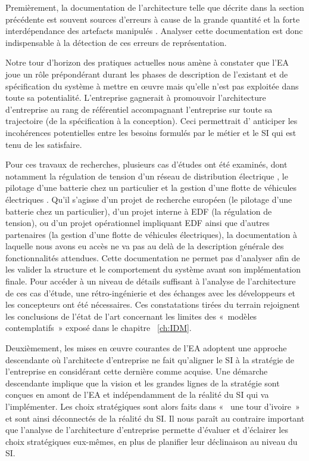 Premièrement, la documentation de l'architecture telle que décrite dans la
section précédente est souvent sources d'erreurs à cause de la grande quantité
et la forte interdépendance des artefacts manipulés
\cite{kaisler_enterprise_2005}. Analyser cette documentation est donc
indispensable à la détection de ces erreurs de représentation.

Notre tour d'horizon des pratiques actuelles nous amène à constater que l'EA
joue un rôle prépondérant durant les phases de description de l'existant et de
spécification du système à mettre en œuvre mais qu'elle n'est pas exploitée dans
toute sa potentialité. L'entreprise gagnerait à promouvoir l'architecture
d'entreprise au rang de référentiel accompagnant l'entreprise sur toute sa
trajectoire (de la spécification à la conception). Ceci permettrait d' anticiper
les incohérences potentielles entre les besoins formulés par le métier et le SI
qui est tenu de les satisfaire.

Pour ces travaux de recherches, plusieurs cas d'études ont été examinés,
dont notamment la régulation de tension d'un réseau de distribution électrique
\cite{seghiri2014simulation}, le pilotage d'une batterie chez un particulier
\cite{seghiri2012animation} et la gestion d'une flotte de véhicules électriques
\cite{seghiri2015simulation}. Qu'il s'agisse d'un projet de recherche européen
(le pilotage d'une batterie chez un particulier), d'un projet interne à EDF (la
régulation de tension), ou d'un projet opérationnel impliquant EDF ainsi que
d'autres partenaires (la gestion d'une flotte de véhicules électriques),
la documentation à laquelle nous avons eu accès ne va pas au delà
de la description générale des fonctionnalités attendues. Cette documentation
ne permet pas d'analyser afin de les valider la structure et le comportement du
système avant son implémentation finale. Pour accéder à un niveau de détails
suffisant à l'analyse de l'architecture de ces cas d'étude, une rétro-ingénierie
et des échanges avec les développeurs et les concepteurs ont été
nécessaires. Ces constatations tirées du terrain rejoignent les conclusions de
l'état de l'art concernant les limites des «~modèles contemplatifs~» exposé
dans le chapitre ~\ref{ch:IDM}.

Deuxièmement, les mises en œuvre courantes de l'EA adoptent une approche
descendante où l'architecte d'entreprise ne fait qu'aligner le SI à la stratégie
de l'entreprise en considérant cette dernière comme acquise. Une démarche
descendante implique que la vision et les grandes lignes de la stratégie sont
conçues en amont de l'EA et indépendamment de la réalité du SI qui va
l'implémenter. Les choix stratégiques sont alors faits dans «~ une tour d'ivoire~»
et sont ainsi déconnectés de la réalité du SI. Il nous paraît au contraire
important que l'analyse de l'architecture d'entreprise permette d'évaluer et
d'éclairer les choix stratégiques eux-mêmes, en plus de planifier leur
déclinaison au niveau du SI.

